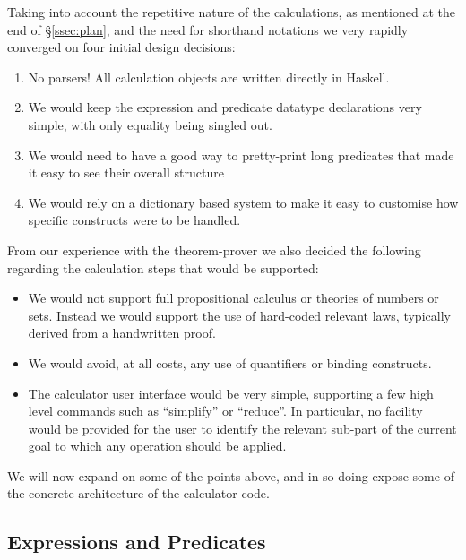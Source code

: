 Taking into account the repetitive nature of the calculations,
as mentioned at the end of \S\ref{ssec:plan},
and the need for shorthand notations we very rapidly converged
on four initial design decisions:
\begin{enumerate}
  \item No parsers! All calculation objects are written
  directly in Haskell.
  \item We would keep the expression and predicate datatype declarations
   very simple, with only equality being singled out.
  \item We would need to have a good way to pretty-print long predicates
    that made it easy to see their overall structure
  \item We would rely on a dictionary based system to
    make it easy to customise how specific constructs
    were to be handled.
\end{enumerate}
From our experience with the  theorem-prover we also decided
the following regarding the calculation steps that would be supported:
\begin{itemize}
  \item
    We would not support full  propositional calculus
    or theories of numbers or sets.
    Instead we would support the use of hard-coded relevant laws,
    typically derived from  a handwritten proof.
  \item
    We would avoid, at all costs,
    any use of quantifiers or binding constructs.
  \item
    The calculator user interface would be very simple,
    supporting a few high level commands such as ``simplify''
    or ``reduce''.
    In particular,
    no facility would be provided for the user to identify
    the relevant sub-part of the current goal to which any operation
    should be applied.
\end{itemize}

We will now expand on some of the points above,
and in so doing expose some of the concrete architecture of the calculator code.

\subsection{Expressions and Predicates}\label{ssec:expr-pred}

